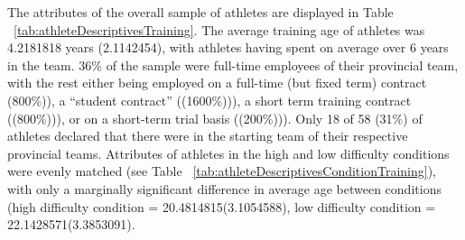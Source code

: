 \documentclass[english]{article}\usepackage[]{graphicx}\usepackage[]{color}
\makeatletter
\newenvironment{kframe}{%
 \def\at@end@of@kframe{}%
 \ifinner\ifhmode%
  \def\at@end@of@kframe{\end{minipage}}%
  \begin{minipage}{\columnwidth}%
 \fi\fi%
 \def\FrameCommand##1{\hskip\@totalleftmargin \hskip-\fboxsep
 \colorbox{shadecolor}{##1}\hskip-\fboxsep
     \hskip-\linewidth \hskip-\@totalleftmargin \hskip\columnwidth}%
 \MakeFramed {\advance\hsize-\width
   \@totalleftmargin\z@ \linewidth\hsize
   \@setminipage}}%
 {\par\unskip\endMakeFramed%
 \at@end@of@kframe}
\newenvironment{knitrout}{}{} %
\makeatother
\begin{document}
\begin{knitrout}
\color{fgcolor}\begin{kframe}


{\ttfamily\noindent\color{warningcolor}{\#\# Warning: package 'dplyr' was built under R version 3.3.2}}

{\ttfamily\noindent\itshape\color{messagecolor}{\#\# \\\#\# Attaching package: 'dplyr'}}

{\ttfamily\noindent\itshape\color{messagecolor}{\#\# The following objects are masked from 'package:stats':\\\#\# \\\#\#\ \ \ \  filter, lag}}

{\ttfamily\noindent\itshape\color{messagecolor}{\#\# The following objects are masked from 'package:base':\\\#\# \\\#\#\ \ \ \  intersect, setdiff, setequal, union}}\end{kframe}
\end{knitrout}





The attributes of the overall sample of athletes are displayed in Table ~\ref{tab:athleteDescriptivesTraining}. The average training age of athletes was 4.2181818 years (2.1142454), with athletes having spent on average over 6 years in the team. 36\% of the sample were full-time employees of their provincial team, with the rest either being employed on a full-time (but fixed term) contract
(800\%)), a ``student contract'' ((1600\%))), a short term training contract
((800\%))), or on a short-term trial basis ((200\%))).  Only 18 of 58 (31\%) of athletes declared that there were in the starting team of their respective provincial teams.  Attributes of athletes in the high and low difficulty conditions were evenly matched (see Table ~\ref{tab:athleteDescriptivesConditionTraining}), with only a marginally significant difference in average age between conditions (high difficulty condition = 20.4814815(3.1054588), low difficulty condition = 22.1428571(3.3853091).
\end{document}
